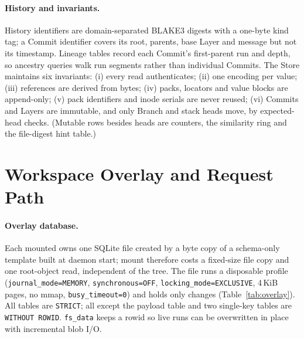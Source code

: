 \paragraph{History and invariants.} History identifiers are domain-separated BLAKE3
digests with a one-byte kind tag; a Commit identifier covers its root, parents, base
Layer and message but not its timestamp. Lineage tables record each Commit's
first-parent run and depth, so ancestry queries walk run segments rather than individual
Commits. The Store maintains six invariants: (i) every read authenticates; (ii) one
encoding per value; (iii) references are derived from bytes; (iv) packs, locators and
value blocks are append-only; (v) pack identifiers and inode serials are never reused;
(vi) Commits and Layers are immutable, and only Branch and stack heads move, by
expected-head checks. (Mutable rows besides heads are counters, the similarity ring and
the file-digest hint table.)

\section{Workspace Overlay and Request Path}
\label{app:overlay}

\paragraph{Overlay database.} Each mounted \ws{} owns one SQLite file created by a byte
copy of a schema-only template built at daemon start; mount therefore costs a fixed-size
file copy and one root-object read, independent of the tree. The file runs a disposable
profile (\texttt{journal\_mode=MEMORY}, \texttt{synchronous=OFF},
\texttt{locking\_mode=EXCLUSIVE}, 4\,KiB pages, no mmap, \texttt{busy\_timeout=0}) and
holds only changes (Table~\ref{tab:overlay}). All tables are \texttt{STRICT}; all except
the payload table and two single-key tables are \texttt{WITHOUT ROWID}. \texttt{fs\_data}
keeps a rowid so live runs can be overwritten in place with incremental blob I/O.

